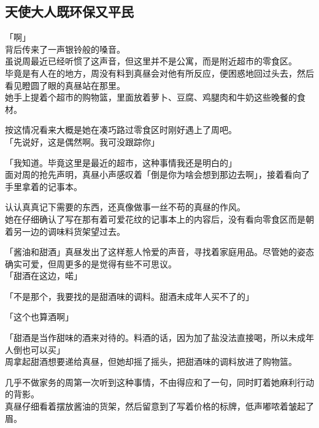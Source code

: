 \subsection{天使大人既环保又平民}

「啊」\\

背后传来了一声银铃般的嗓音。\\

虽说周最近已经听惯了这声音，但这里并不是公寓，而是附近超市的零食区。\\

毕竟是有人在的地方，周没有料到真昼会对他有所反应，便困惑地回过头去，然后看见瞪圆了眼的真昼站在那里。\\

她手上提着个超市的购物篮，里面放着萝卜、豆腐、鸡腿肉和牛奶这些晚餐的食材。

按这情况看来大概是她在凑巧路过零食区时刚好遇上了周吧。\\

「先说好，这是偶然啊。我可没跟踪你」

「我知道。毕竟这里是最近的超市，这种事情我还是明白的」\\

面对周的抢先声明，真昼小声感叹着「倒是你为啥会想到那边去啊」，接着看向了手里拿着的记事本。

认认真真记下需要的东西，还真像做事一丝不苟的真昼的作风。\\

她在仔细确认了写在那有着可爱花纹的记事本上的内容后，没有看向零食区而是朝着另一边的调味料货架望过去。

「酱油和甜酒」真昼发出了这样惹人怜爱的声音，寻找着家庭用品。尽管她的姿态确实可爱，但周更多的是觉得有些不可思议。\\

「甜酒在这边，喏」

「不是那个，我要找的是甜酒味的调料。甜酒未成年人买不了的」

「这个也算酒啊」

「甜酒是当作甜味的酒来对待的。料酒的话，因为加了盐没法直接喝，所以未成年人倒也可以买」\\

周拿起甜酒想要递给真昼，但她却摇了摇头，把甜酒味的调料放进了购物篮。

几乎不做家务的周第一次听到这种事情，不由得应和了一句，同时盯着她麻利行动的背影。\\

真昼仔细看着摆放酱油的货架，然后留意到了写着价格的标牌，低声嘟哝着皱起了眉。\\

